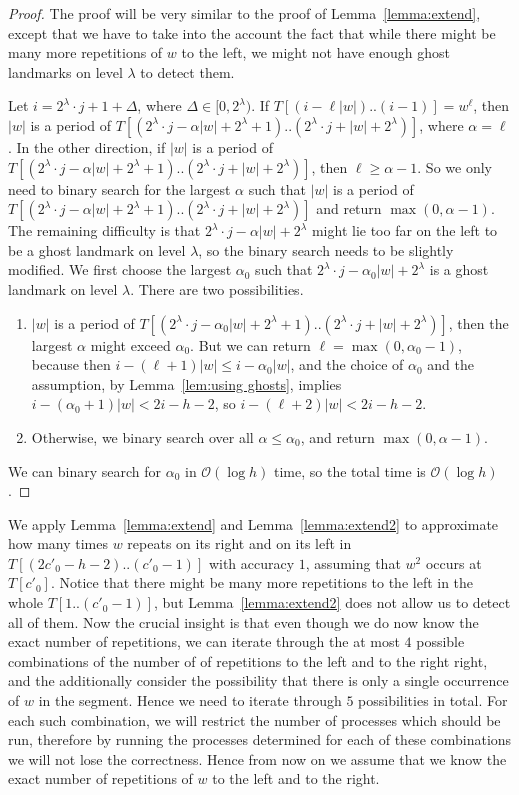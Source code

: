 \documentclass{article}[11pt,letter]
\newcommand{\bigo}{\mathcal{O}}
\newcommand{\head}{h}
\newcommand{\level}{\lambda}
\begin{document}
\begin{proof}
The proof will be very similar to the proof of Lemma~\ref{lemma:extend}, except that we have to take into the account the fact that while there might
be many more repetitions of $w$ to the left, we might not have enough ghost landmarks on level $\level$ to detect them.

Let $i = 2^{\level}\cdot j+1+\Delta$, where $\Delta\in [0,2^{\level})$.
If $T[(i-\ell |w|)..(i-1)]=w^{\ell}$, then $|w|$ is a period of $T[(2^{\level}\cdot j-\alpha |w|+2^{\level}+1)..(2^{\level}\cdot j+|w|+2^{\level})]$,
where $\alpha= \ell$. In the other direction, if $|w|$ is a period of
$T[(2^{\level}\cdot j-\alpha |w|+2^{\level}+1)..(2^{\level}\cdot j+|w|+2^{\level})]$, then $\ell \geq \alpha-1$.
So we only need to binary search for the largest $\alpha$ such that $|w|$ is a period of
$T[(2^{\level}\cdot j-\alpha |w|+2^{\level}+1)..(2^{\level}\cdot j+|w|+2^{\level})]$ and return $\max(0,\alpha-1)$.
The remaining difficulty is that $2^{\level}\cdot j-\alpha |w|+2^{\level}$ might lie too far on the left to be a ghost landmark on level $\level$,
so the binary search needs to be slightly modified.
We first choose the largest $\alpha_{0}$ such that $2^{\level}\cdot j-\alpha_{0} |w|+2^{\level}$ is a ghost landmark on level $\level$. There
are two possibilities.
\begin{enumerate}
\item $|w|$ is a period of $T[(2^{\level}\cdot j-\alpha_{0} |w|+2^{\level}+1)..(2^{\level}\cdot j+|w|+2^{\level})]$, then the largest
$\alpha$ might exceed $\alpha_{0}$. But we can return $\ell=\max(0,\alpha_{0}-1)$, because then
$i-(\ell+1) |w|\leq i-\alpha_{0}|w|$, and the choice of $\alpha_{0}$ and the assumption, by Lemma~\ref{lem:using ghosts}, implies
$i-(\alpha_{0}+1)|w|<2i-\head-2$,
so $i-(\ell+2)|w| < 2i-\head-2$.
\item Otherwise, we binary search over all $\alpha\leq \alpha_{0}$, and return $\max(0,\alpha-1)$.
\end{enumerate}
We can binary search for $\alpha_{0}$ in $\bigo(\log h)$ time, so the total time is $\bigo(\log h)$.
\end{proof}

We apply Lemma~\ref{lemma:extend} and Lemma~\ref{lemma:extend2} to
approximate how many times $w$ repeats on its right and on its left in $T[(2c'_{0}-\head-2)..(c'_{0}-1)]$ with accuracy $1$,
assuming that $w^{2}$ occurs at $T[c'_{0}]$.
Notice that there might be many more repetitions to the left in the whole $T[1..(c'_{0}-1)]$, but Lemma~\ref{lemma:extend2} does not
allow us to detect all of them.
Now the crucial insight is that even though we do now know the exact number of repetitions, we can iterate through the at most $4$ possible combinations of
the number of of repetitions to the left and to the right right, and the additionally consider the possibility that there is only a single
occurrence of $w$ in the segment. Hence we need to iterate through $5$ possibilities in total.
For each such combination, we will restrict the number of processes which should be run, therefore by running the processes
determined for each of these combinations we will not lose the correctness.
Hence from now on we assume that we know the exact number of repetitions of $w$ to the left and to the right.
\end{document}
